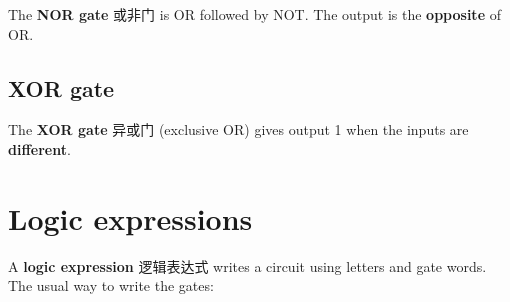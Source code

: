 \documentclass[11pt]{article}
\begin{document}
The \textbf{NOR gate} 或非门 is OR followed by NOT. The output is the \textbf{opposite} of OR.

\begin{center}
\end{center}

\subsection*{XOR gate}

The \textbf{XOR gate} 异或门 (exclusive OR) gives output 1 when the inputs are \textbf{different}.

\begin{center}
\end{center}

\section*{Logic expressions}

A \textbf{logic expression} 逻辑表达式 writes a circuit using letters and gate words. The usual way to write the gates:

\begin{center}
\end{center}
\end{document}
